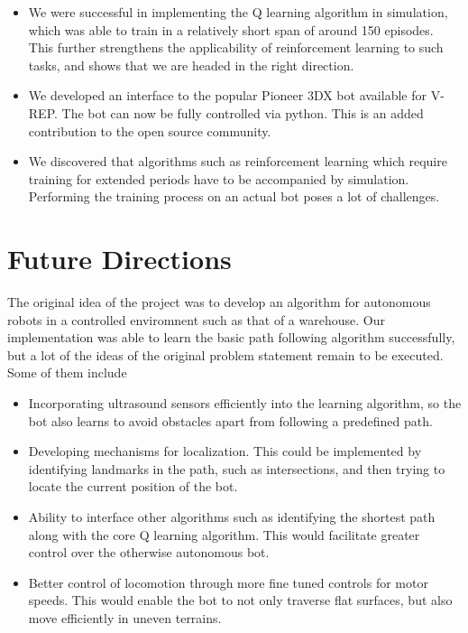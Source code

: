 \documentclass[12pt]{extreport}
\begin{document}
\begin{itemize}
    \item We were successful in implementing the Q learning algorithm in simulation, which was able to train in a relatively short span of around 150 episodes. This further strengthens the applicability of reinforcement learning to such tasks, and shows that we are headed in the right direction.
    \item We developed an interface to the popular Pioneer 3DX bot available for V-REP. The bot can now be fully controlled via python. This is an added contribution to the open source community.
    \item We discovered that algorithms such as reinforcement learning which require training for extended periods have to be accompanied by simulation. Performing the training process on an actual bot poses a lot of challenges.

\end{itemize}

\chapter{Future Directions}

The original idea of the project was to develop an algorithm for autonomous robots in a controlled enviromnent such as that of a warehouse. Our implementation was able to learn the basic path following algorithm successfully, but a lot of the ideas of the original problem statement remain to be executed. Some of them include

\begin{itemize}
    \item Incorporating ultrasound sensors efficiently into the learning algorithm, so the bot also learns to avoid obstacles apart from following a predefined path.
    \item Developing mechanisms for localization. This could be implemented by identifying landmarks in the path, such as intersections, and then trying to locate the current position of the bot.
    \item Ability to interface other algorithms such as identifying the shortest path along with the core Q learning algorithm. This would facilitate greater control over the otherwise autonomous bot.
    \item Better control of locomotion through more fine tuned controls for motor speeds. This would enable the bot to not only traverse flat surfaces, but also move efficiently in uneven terrains.
\end{itemize}




\end{document}
